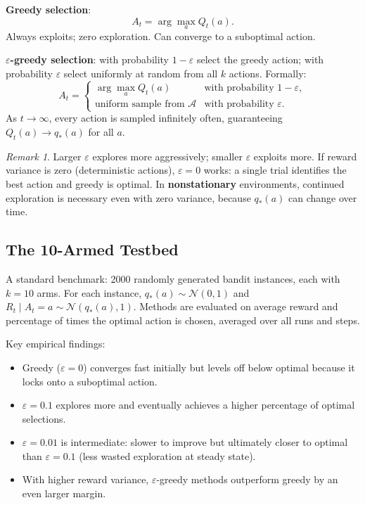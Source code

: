 \documentclass[11pt,a4paper]{article}
\theoremstyle{definition}
\theoremstyle{plain}
\theoremstyle{remark}
\newtheorem*{remark}{Remark}
\begin{document}
\textbf{Greedy selection}:
\[
    A_t = \arg\max_a Q_t(a).
\]
Always exploits; zero exploration. Can converge to a suboptimal action.

\textbf{$\varepsilon$-greedy selection}: with probability $1 - \varepsilon$ select the greedy action; with probability $\varepsilon$ select uniformly at random from all $k$ actions. Formally:
\[
    A_t =
    \begin{cases}
        \arg\max_a Q_t(a) & \text{with probability } 1 - \varepsilon, \\
        \text{uniform sample from } \mathcal{A} & \text{with probability } \varepsilon.
    \end{cases}
\]
As $t \to \infty$, every action is sampled infinitely often, guaranteeing $Q_t(a) \to q_*(a)$ for all $a$.

\begin{remark}
Larger $\varepsilon$ explores more aggressively; smaller $\varepsilon$ exploits more. If reward variance is zero (deterministic actions), $\varepsilon = 0$ works: a single trial identifies the best action and greedy is optimal. In \textbf{nonstationary} environments, continued exploration is necessary even with zero variance, because $q_*(a)$ can change over time.
\end{remark}

\subsection{The 10-Armed Testbed}

A standard benchmark: 2000 randomly generated bandit instances, each with $k = 10$ arms. For each instance, $q_*(a) \sim \mathcal{N}(0, 1)$ and $R_t \mid A_t = a \sim \mathcal{N}(q_*(a), 1)$. Methods are evaluated on average reward and percentage of times the optimal action is chosen, averaged over all runs and steps.

Key empirical findings:
\begin{itemize}
    \item Greedy ($\varepsilon = 0$) converges fast initially but levels off below optimal because it locks onto a suboptimal action.
    \item $\varepsilon = 0.1$ explores more and eventually achieves a higher percentage of optimal selections.
    \item $\varepsilon = 0.01$ is intermediate: slower to improve but ultimately closer to optimal than $\varepsilon = 0.1$ (less wasted exploration at steady state).
    \item With higher reward variance, $\varepsilon$-greedy methods outperform greedy by an even larger margin.
\end{itemize}
\end{document}
